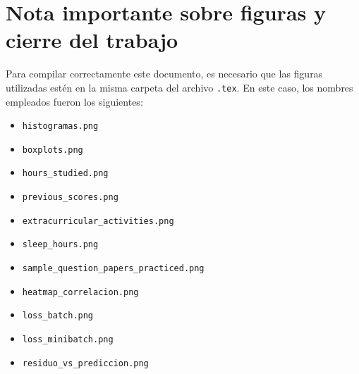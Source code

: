 \documentclass[conference]{IEEEtran}
\begin{document}
\section*{Nota importante sobre figuras y cierre del trabajo}

Para compilar correctamente este documento, es necesario que las figuras utilizadas estén en la misma carpeta del archivo \texttt{.tex}. En este caso, los nombres empleados fueron los siguientes:

\begin{itemize}
    \item \texttt{histogramas.png}
    \item \texttt{boxplots.png}
    \item \texttt{hours\_studied.png}
    \item \texttt{previous\_scores.png}
    \item \texttt{extracurricular\_activities.png}
    \item \texttt{sleep\_hours.png}
    \item \texttt{sample\_question\_papers\_practiced.png}
    \item \texttt{heatmap\_correlacion.png}
    \item \texttt{loss\_batch.png}
    \item \texttt{loss\_minibatch.png}
    \item \texttt{residuo\_vs\_prediccion.png}
\end{itemize}
\end{document}
